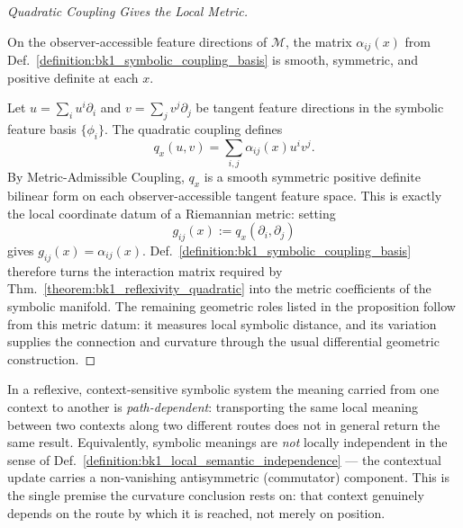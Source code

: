 \begin{proof}[Quadratic Coupling Gives the Local Metric]
\label{proof:bk1_bridge_to_geometry}
\leavevmode

\begin{assumption}
On the observer-accessible feature directions of \(\mathcal{M}\), the matrix
\(\alpha_{ij}(x)\) from Def.~\ref{definition:bk1_symbolic_coupling_basis} is
smooth, symmetric, and positive definite at each \(x\).
\end{assumption}

Let \(u=\sum_i u^i\partial_i\) and \(v=\sum_j v^j\partial_j\) be tangent
feature directions in the symbolic feature basis \(\{\phi_i\}\). The quadratic
coupling defines
\[
q_x(u,v)=\sum_{i,j}\alpha_{ij}(x)u^i v^j .
\]
By Metric-Admissible Coupling, \(q_x\) is a smooth symmetric positive definite
bilinear form on each observer-accessible tangent feature space. This is exactly
the local coordinate datum of a Riemannian metric: setting
\[
g_{ij}(x):=q_x(\partial_i,\partial_j)
\]
gives \(g_{ij}(x)=\alpha_{ij}(x)\). Def.~\ref{definition:bk1_symbolic_coupling_basis}
therefore turns the interaction matrix required by
Thm.~\ref{theorem:bk1_reflexivity_quadratic} into the metric coefficients of
the symbolic manifold. The remaining geometric roles listed in the proposition
follow from this metric datum: it measures local symbolic distance, and its
variation supplies the connection and curvature through the usual differential
geometric construction.
\end{proof}

\begin{axiom}
\label{axiom:bk1_semantic_non_integrability}
In a reflexive, context-sensitive symbolic system the meaning carried from one
context to another is \emph{path-dependent}: transporting the same local meaning
between two contexts along two different routes does not in general return the
same result. Equivalently, symbolic meanings are \emph{not} locally independent
in the sense of Def.~\ref{definition:bk1_local_semantic_independence} --- the
contextual update carries a non-vanishing antisymmetric (commutator) component.
This is the single premise the curvature conclusion rests on: that context
genuinely depends on the route by which it is reached, not merely on position.
\end{axiom}

